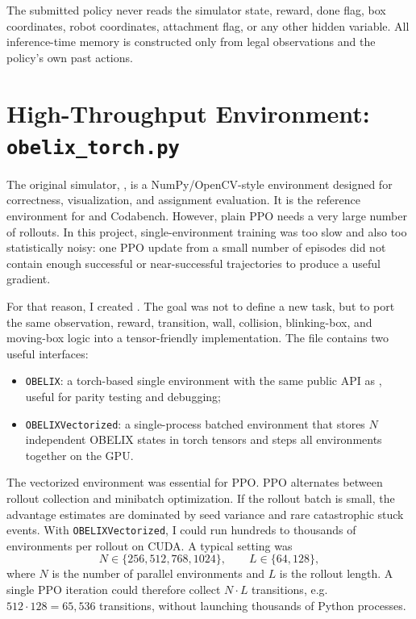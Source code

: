 \documentclass[11pt, oneside]{article}   	%
\begin{document}
The submitted policy never reads the simulator state, reward, done flag, box
coordinates, robot coordinates, attachment flag, or any other hidden variable. All
inference-time memory is constructed only from legal observations and the policy's own
past actions.

\section{High-Throughput Environment: \texttt{obelix\_torch.py}}

The original simulator, , is a NumPy/OpenCV-style environment designed
for correctness, visualization, and assignment evaluation. It is the reference
environment for  and Codabench. However, plain PPO needs a very large
number of rollouts. In this project, single-environment training was too slow and also
too statistically noisy: one PPO update from a small number of episodes did not contain
enough successful or near-successful trajectories to produce a useful gradient.

For that reason, I created . The goal was not to define a new task,
but to port the same observation, reward, transition, wall, collision, blinking-box, and
moving-box logic into a tensor-friendly implementation. The file contains two useful
interfaces:
\begin{itemize}[leftmargin=1.5em]
  \item \texttt{OBELIX}: a torch-based single environment with the same public API as
  , useful for parity testing and debugging;
  \item \texttt{OBELIXVectorized}: a single-process batched environment that stores
  \(N\) independent OBELIX states in torch tensors and steps all environments together
  on the GPU.
\end{itemize}

The vectorized environment was essential for PPO. PPO alternates between rollout
collection and minibatch optimization. If the rollout batch is small, the advantage
estimates are dominated by seed variance and rare catastrophic stuck events. With
\texttt{OBELIXVectorized}, I could run hundreds to thousands of environments per
rollout on CUDA. A typical setting was
\[
  N\in\{256,512,768,1024\},
  \qquad
  L\in\{64,128\},
\]
where \(N\) is the number of parallel environments and \(L\) is the rollout length. A
single PPO iteration could therefore collect \(N\cdot L\) transitions, e.g.
\(512\cdot128=65{,}536\) transitions, without launching thousands of Python processes.
\end{document}
